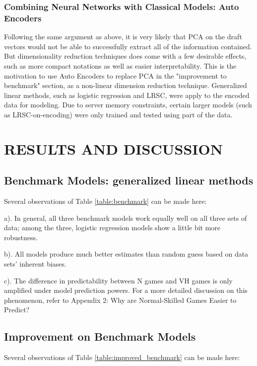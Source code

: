 \documentclass{article}
\begin{document}
\subsubsection{Combining Neural Networks with Classical Models: Auto Encoders}
Following the same argument as above, it is very likely that PCA on the draft vectors would not be able to successfully extract all of the information contained. But dimensionality reduction techniques does come with a few desirable effects, such as more compact notations as well as easier interpretability. This is the motivation to use Auto Encoders to replace PCA in the "improvement to benchmark" section, as a non-linear dimension reduction technique. Generalized linear methods, such as logistic regression and LRSC, were apply to the encoded data for modeling. Due to server memory constraints, certain larger models (such as LRSC-on-encoding) were only trained and tested using part of the data.





\section{RESULTS AND DISCUSSION}
\subsection{Benchmark Models: generalized linear methods}




Several observations of Table \ref{table:benchmark} can be made here:

a). In general, all three benchmark models work equally well on all three sets of data; among the three, logistic regression models show a little bit more robustness.

b). All models produce much better estimates than random guess based on data sets’ inherent biases.

c). The difference in predictability between N games and VH games is only amplified under model prediction powers. For a more detailed discussion on this phenomenon, refer to Appendix 2: Why are Normal-Skilled Games Easier to Predict?

\subsection{Improvement on Benchmark Models}



Several observations of Table \ref{table:improved_benchmark} can be made here:
\end{document}
